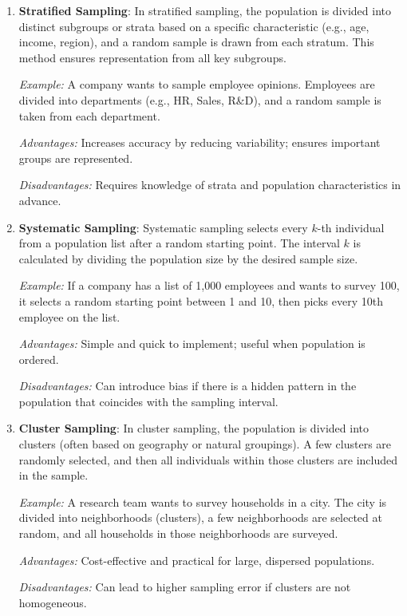 \documentclass[twoside]{book}
\begin{document}
\begin{enumerate}
    \item \textbf{Stratified Sampling}: In stratified sampling, the population is divided into distinct subgroups or strata based on a specific characteristic (e.g., age, income, region), and a random sample is drawn from each stratum. This method ensures representation from all key subgroups.

\textit{Example:} A company wants to sample employee opinions. Employees are divided into departments (e.g., HR, Sales, R\&D), and a random sample is taken from each department.

\textit{Advantages:} Increases accuracy by reducing variability; ensures important groups are represented.

\textit{Disadvantages:} Requires knowledge of strata and population characteristics in advance.

\item \textbf{Systematic Sampling}: Systematic sampling selects every $k$-th individual from a population list after a random starting point. The interval $k$ is calculated by dividing the population size by the desired sample size.

\textit{Example:} If a company has a list of 1,000 employees and wants to survey 100, it selects a random starting point between 1 and 10, then picks every 10th employee on the list.

\textit{Advantages:} Simple and quick to implement; useful when population is ordered.

\textit{Disadvantages:} Can introduce bias if there is a hidden pattern in the population that coincides with the sampling interval.

\item \textbf{Cluster Sampling}: In cluster sampling, the population is divided into clusters (often based on geography or natural groupings). A few clusters are randomly selected, and then all individuals within those clusters are included in the sample.

\textit{Example:} A research team wants to survey households in a city. The city is divided into neighborhoods (clusters), a few neighborhoods are selected at random, and all households in those neighborhoods are surveyed.

\textit{Advantages:} Cost-effective and practical for large, dispersed populations.

\textit{Disadvantages:} Can lead to higher sampling error if clusters are not homogeneous.


\end{enumerate}
\end{document}
